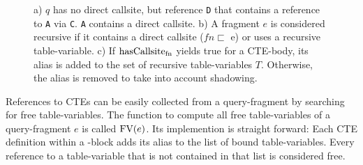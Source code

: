 \begin{figure}[h]
    \small
    \centering
    \caption{a) $q$ has no direct callsite, but reference \texttt{D} that contains a reference to \texttt{A} via \texttt{C}. \texttt{A} contains a direct callsite. b) A fragment $e$ is considered recursive if it contains a direct callsite ($fn \sqsubset$ e) or uses a recursive table-variable. c) If $\operatorname{\text{hasCallsite}_{fn}}$ yields true for a CTE-body, its alias is added to the set of recursive table-variables $T$. Otherwise, the alias is removed to take into account shadowing.}
    \label{fig:tracking_recursive_ctes}
\end{figure}

References to CTEs can be easily collected from a query-fragment by searching for free table-variables. The function to compute all free table-variables of a query-fragment $e$ is called $\operatorname{\text{\rm FV}}(e)$. Its implemention is straight forward: Each CTE definition within a \WITH-block adds its alias to the list of bound table-variables. Every reference to a table-variable that is not contained in that list is considered free.


